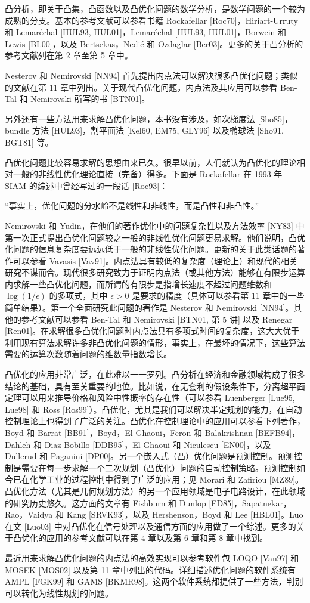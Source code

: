 \documentclass[UTF8,12pt,a4paper,fontset=fandol]{ctexart}
\begin{document}
凸分析，即关于凸集，凸函数以及凸优化问题的数学分析，是数学问题的一个较为成熟的分支。基本的参考文献可以参看书籍 Rockafellar [Roc70]，Hiriart-Urruty 和 Lemaréchal [HUL93, HUL01]，Lemaréchal [HUL93, HUL01]，Borwein 和 Lewis [BL00]，以及 Bertsekas，Nedić 和 Ozdaglar [Ber03]。更多的关于凸分析的参考文献列在第 2 章至第 5 章中。

Nesterov 和 Nemirovski [NN94] 首先提出内点法可以解决很多凸优化问题；类似的文献在第 11 章中列出。关于现代凸优化问题，内点法及其应用可以参看 Ben-Tal 和 Nemirovski 所写的书 [BTN01]。

另外还有一些方法用来求解凸优化问题，本书没有涉及，如次梯度法 [Sho85]，bundle 方法 [HUL93]，割平面法 [Kel60, EM75, GLY96] 以及椭球法 [Sho91, BGT81] 等。

凸优化问题比较容易求解的思想由来已久。很早以前，人们就认为凸优化的理论相对一般的非线性优化理论直接（完备）得多。下面是 Rockafellar 在 1993 年 SIAM 的综述中曾经写过的一段话 [Roc93]：

“事实上，优化问题的分水岭不是线性和非线性，而是凸性和非凸性。”

Nemirovski 和 Yudin，在他们的著作优化中的问题复杂性以及方法效率 [NY83] 中第一次正式提出凸优化问题较之一般的非线性优化问题更易求解。他们说明，凸优化问题的信息复杂度要远远低于一般的非线性优化问题。更新的关于此类话题的著作可以参看 Vavasis [Vav91]。内点法具有较低的复杂度（理论上）和现代的相关研究不谋而合。现代很多研究致力于证明内点法（或其他方法）能够在有限步运算内求解一些凸优化问题，而所谓的有限步是指增长速度不超过问题维数和 $\log(1/\epsilon)$ 的多项式，其中 $\epsilon>0$ 是要求的精度（具体可以参看第 11 章中的一些简单结果）。第一个全面研究此问题的著作是 Nesterov 和 Nemirovski [NN94]。其他的参考文献可以参看 Ben-Tal 和 Nemirovski [BTN01, 第 5 讲] 以及 Renegar [Ren01]。在求解很多凸优化问题时内点法具有多项式时间的复杂度，这大大优于利用现有算法求解许多非凸优化问题的情形，事实上，在最坏的情况下，这些算法需要的运算次数随着问题的维数量指数增长。

凸优化的应用非常广泛，在此难以一一罗列。凸分析在经济和金融领域构成了很多结论的基础，具有至关重要的地位。比如说，在无套利的假设条件下，分离超平面定理可以用来推导价格和风险中性概率的存在性（可以参看 Luenberger [Lue95, Lue98] 和 Ross [Ros99]）。凸优化，尤其是我们可以解决半定规划的能力，在自动控制理论上也得到了广泛的关注。凸优化在控制理论中的应用可以参看下列著作，Boyd 和 Barrat [BB91]，Boyd，El Ghaoui，Feron 和 Balakrishnan [BEFB94]，Dahleh 和 Diaz-Bobillo [DDB95]，El Ghaoui 和 Niculescu [EN00]，以及 Dullerud 和 Paganini [DP00]。另一个嵌入式（凸）优化问题是预测控制。预测控制是需要在每一步求解一个二次规划（凸优化）问题的自动控制策略。预测控制如今已在化学工业的过程控制中得到了广泛的应用；见 Morari 和 Zafiriou [MZ89]。凸优化方法（尤其是几何规划方法）的另一个应用领域是电子电路设计，在此领域的研究历史悠久。这方面的文章有 Fishburn 和 Dunlop [FD85]，Sapatnekar，Rao，Vaidya 和 Kang [SRVK93]，以及 Hershenson，Boyd 和 Lee [HBL01]。Luo 在文 [Luo03] 中对凸优化在信号处理以及通信方面的应用做了一个综述。更多的关于凸优化的应用的参考文献可以在第 4 章以及第 6 章和第 8 章中找到。

最近用来求解凸优化问题的内点法的高效实现可以参考软件包 LOQO [Van97] 和 MOSEK [MOS02] 以及第 11 章中列出的代码。详细描述优化问题的软件系统有 AMPL [FGK99] 和 GAMS [BKMR98]。这两个软件系统都提供了一些方法，判别可以转化为线性规划的问题。
\end{document}
